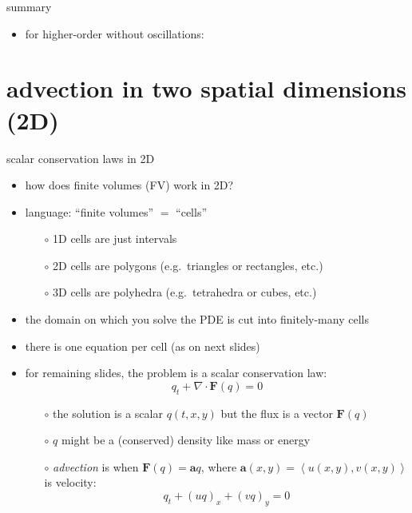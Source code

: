 \documentclass[10pt,hyperref,dvipsnames]{beamer}
\newcommand{\ba}{\mathbf{a}}
\newcommand{\bF}{\mathbf{F}}
\newcommand{\Div}{\nabla\cdot}
\begin{document}
\begin{frame}{summary}
\begin{itemize}
\begin{itemize}
\begin{itemize}
        \item for higher-order without oscillations:
        \end{itemize}
    \end{itemize}
\end{itemize}
\end{frame}


\section{advection in two spatial dimensions (2D)}

\begin{frame}{scalar conservation laws in 2D}

\begin{itemize}
\item how does finite volumes (FV) work in 2D?
\item language: ``finite volumes'' $=$ ``cells''
    \begin{itemize}
    \item[$\circ$] 1D cells are just intervals
    \item[$\circ$] 2D cells are polygons (e.g.~triangles or rectangles, etc.)
    \item[$\circ$] 3D cells are polyhedra (e.g.~tetrahedra or cubes, etc.)
    \end{itemize}
\item the domain on which you solve the PDE is cut into finitely-many cells
\item there is one equation per cell (as on next slides)

\bigskip
\item for remaining slides, the problem is a scalar conservation law:
    $$q_t + \Div \bF(q) = 0$$

    \begin{itemize}
    \item[$\circ$] the solution is a scalar $q(t,x,y)$ but the flux is a vector $\bF(q)$
    \item[$\circ$] $q$ might be a (conserved) density like mass or energy
    \item[$\circ$] \emph{advection} is when $\bF(q) = \ba q$, where $\ba(x,y) = \left<u(x,y), v(x,y)\right>$ is velocity:
    $$q_t + (u q)_x + (v q)_y = 0$$
    \end{itemize}
\end{itemize}
\end{frame}
\end{document}
